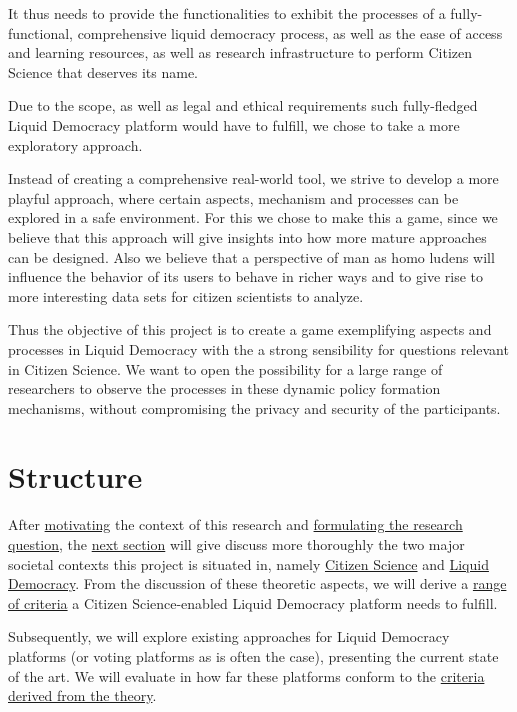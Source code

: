 It thus needs to provide the functionalities to exhibit the processes of a fully-functional, comprehensive liquid democracy process, as well as the ease of access and learning resources, as well as research infrastructure to perform Citizen Science that deserves its name.

Due to the scope, as well as legal and ethical requirements such fully-fledged Liquid Democracy platform would have to fulfill, we chose to take a more exploratory approach. 

Instead of creating a comprehensive real-world tool, we strive to develop a more playful approach, where certain aspects, mechanism and processes can be explored in a safe environment. For this we chose to make this a game, since we believe that this approach will give insights into how more mature approaches can be designed. Also we believe that a perspective of man as homo ludens will influence the behavior of its users to behave in richer ways and to give rise to more interesting data sets for citizen scientists to analyze.

Thus the objective of this project is to create a game exemplifying aspects and processes in Liquid Democracy with the a strong sensibility for questions relevant in Citizen Science. We want to open the possibility for a large range of researchers to observe the processes in these dynamic policy formation mechanisms, without compromising the privacy and security of the participants.

\section{Structure}
\label{sec:structure}


After \hyperref[sec:Motivation]{motivating} the context of this research and \hyperref[sec:Objective]{formulating the research question}, the \hyperref[ch:Theory]{next section} will give discuss more thoroughly the two major societal contexts this project is situated in, namely \hyperref[sec:Theory_CS]{Citizen Science} and \hyperref[sec:Liquid_Democracy]{Liquid Democracy}. From the discussion of these theoretic aspects, we will derive a \hyperref[sec:Criteria]{range of criteria} a Citizen Science-enabled Liquid Democracy platform needs to fulfill.

Subsequently, we will explore existing approaches for Liquid Democracy platforms (or voting platforms as is often the case), presenting the current state of the art. We will evaluate in how far these platforms conform to the \hyperref[sec:Criteria]{criteria derived from the theory}. 

